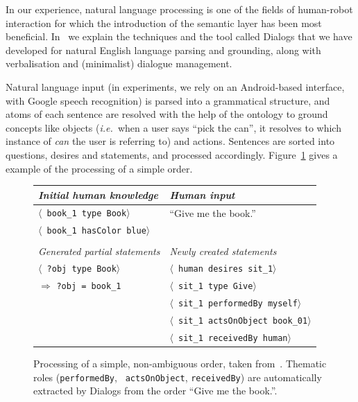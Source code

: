 \documentclass[preprint,3p,times]{elsarticle}
\newcommand{\concept}[1]{{\small \texttt{#1}}}
\newcommand{\stmt}[1]{{\footnotesize \tt $\langle$ #1\relax$\rangle$}}
\newcommand{\ie}{{\textit{i.e.\ }}}
\begin{document}
In our experience, natural language processing is one of the fields of
human-robot interaction for which the introduction of the semantic layer has
been most beneficial.  In~\cite{Lemaignan2011a} we explain the techniques and the
tool called {\sc Dialogs} that we have developed for natural English language
parsing and grounding, along with verbalisation and (minimalist) dialogue
management.

Natural language input (in experiments, we rely on an Android-based interface,
with Google speech recognition) is parsed into a grammatical structure, and
atoms of each sentence are resolved with the help of the ontology to ground
concepts like objects (\ie when a user says ``pick the can'', it resolves to which
instance of \emph{can} the user is referring to) and actions. Sentences are
sorted into questions, desires and statements, and processed accordingly.
Figure~\ref{dialogs|ex} gives a example of the processing of a simple order.

\begin{figure}
    \centering
	\begin{tabular}{l|l}
	\emph{Initial human knowledge} &
	\emph{Human input}\\
	
	\hline
	
    	\stmt{book\_1 type Book} &
	``Give me the book.'' \\
	
    	\stmt{book\_1 hasColor blue} & \\
	\vspace{0.5em}\\
	\hline
    	
	\emph{Generated partial statements} &
	\emph{Newly created statements}\\
	\hline
    	\stmt{?obj type Book} & 
	\stmt{human desires sit\_1} \\
	
	\hspace{0.2cm}$\Rightarrow$ \concept{?obj = book\_1}
    	& \stmt{sit\_1 type Give} \\
    	& \stmt{sit\_1 performedBy myself} \\
    	& \stmt{sit\_1 actsOnObject book\_01} \\
    	& \stmt{sit\_1 receivedBy human} \\
	\end{tabular}

    \caption{Processing of a simple, non-ambiguous order, taken
        from~\cite{Lemaignan2011a}. Thematic roles ({\tt performedBy}, {\tt
        actsOnObject}, {\tt receivedBy}) are automatically extracted by 
    {\sc Dialogs} from the order ``Give me the book.''.}

    \label{dialogs|ex}
\end{figure}
\end{document}
